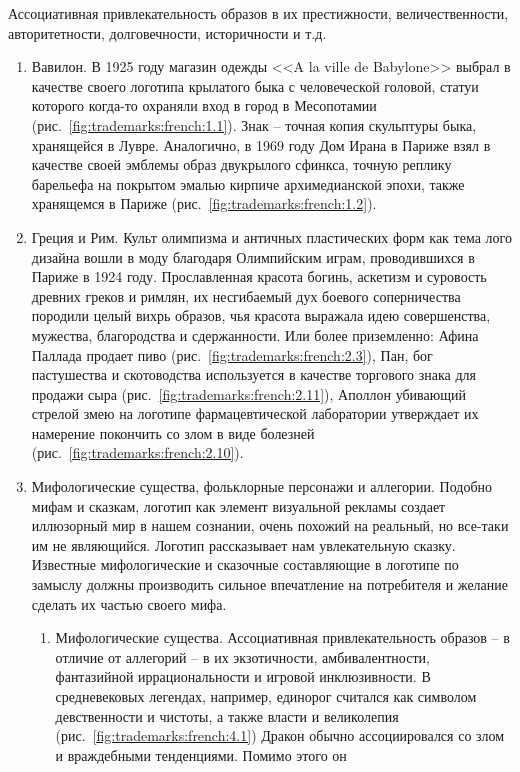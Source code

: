 Ассоциативная привлекательность образов в их престижности, величественности,
авторитетности, долговечности, историчности и т.д.
\begin{enumerate}
\item Вавилон. В 1925 году магазин одежды <<A la ville de Babylone>> выбрал в качестве своего
  логотипа крылатого быка с человеческой головой, статуи которого когда-то охраняли вход в город в
  Месопотамии (рис.~\ref{fig:trademarks:french:1.1}).  Знак -- точная копия скульптуры быка, хранящейся в
  Лувре. Аналогично, в 1969 году Дом Ирана в Париже взял в качестве своей эмблемы образ двукрылого
  сфинкса, точную реплику барельефа на покрытом эмалью кирпиче архимедианской эпохи, также хранящемся
  в Париже (рис.~\ref{fig:trademarks:french:1.2}).
\item Греция и Рим. Культ олимпизма и античных пластических форм как тема лого дизайна вошли в моду
  благодаря Олимпийским играм, проводившихся в Париже в 1924 году. Прославленная красота богинь,
  аскетизм и суровость древних греков и римлян, их несгибаемый дух боевого соперничества породили
  целый вихрь образов, чья красота выражала идею совершенства, мужества, благородства и
  сдержанности. Или более приземленно: Афина Паллада продает пиво (рис.~\ref{fig:trademarks:french:2.3}),
  Пан, бог пастушества и скотоводства используется в качестве торгового знака для продажи сыра
  (рис.~\ref{fig:trademarks:french:2.11}), Аполлон убивающий стрелой
  змею на логотипе фармацевтической лаборатории утверждает их намерение покончить со злом в виде
  болезней (рис.~\ref{fig:trademarks:french:2.10}).
\item Мифологические существа, фольклорные персонажи и аллегории. Подобно мифам и сказкам, логотип
  как элемент визуальной рекламы создает иллюзорный мир в нашем сознании, очень похожий на реальный,
  но все-таки им не являющийся.  Логотип рассказывает нам увлекательную сказку. Известные
  мифологические и сказочные составляющие в логотипе по замыслу должны производить сильное впечатление
  на потребителя и желание сделать их частью своего мифа.
  \begin{enumerate}
  \item Мифологические существа. Ассоциативная привлекательность образов --
    в отличие от аллегорий -- в их экзотичности, амбивалентности,
    фантазийной иррациональности и игровой инклюзивности. В средневековых
    легендах, например, единорог считался как символом девственности и
    чистоты, а также власти и великолепия (рис.~\ref{fig:trademarks:french:4.1}) Дракон обычно
    ассоциировался со злом и враждебными тенденциями. Помимо этого он

\end{enumerate}
\end{enumerate}
